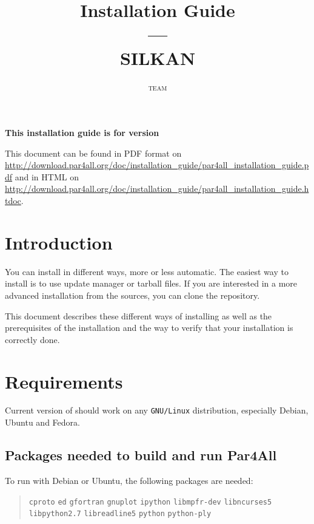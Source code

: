 \documentclass[a4paper]{article}
\newcommand{\LINK}[1]{\url{#1}\xspace}
\newcommand{\PfaInstallationPDF}{\LINK{http://download.par4all.org/doc/installation_guide/par4all_installation_guide.pdf}}
\newcommand{\PfaAllInstallationHTDOC}{\LINK{http://download.par4all.org/doc/installation_guide/par4all_installation_guide.htdoc}}
\begin{document}
\title{\protect\Apfa Installation Guide\\
  ---\\
  SILKAN}

\author{\Apfa \textsc{team}}

\maketitle

\noindent\textbf{This installation guide is for \Apfa version }
\bigskip

This document can be found in PDF format on \PfaInstallationPDF and in HTML
on \PfaAllInstallationHTDOC.


\section{Introduction}
\label{sec:introduction}


You can install \Apfa in different ways, more or less automatic. The easiest
way to install \Apfa is to use update manager or tarball files. If you are
interested in a more advanced installation from the sources, you can clone
the \Apfa{} \Agit repository.

This document describes these different ways of installing \Apfa as well
as the prerequisites of the installation and the way to verify that your
installation is correctly done.


\section{Requirements}
\label{sec:requirements}

Current version of \Apfa should work on any \texttt{GNU/Linux}
distribution, especially Debian, Ubuntu and Fedora.


\subsection{Packages needed to build and run Par4All}
\label{sec:pack-need-build}


To run \Apfa with Debian or Ubuntu, the following packages are needed:
\begin{quote}
  \texttt{cproto} \texttt{ed} \texttt{gfortran} \texttt{gnuplot}
  \texttt{ipython} \texttt{libmpfr-dev} \texttt{libncurses5}
  \texttt{libpython2.7} \texttt{libreadline5} \texttt{python}
  \texttt{python-ply}
\end{quote}
\end{document}
